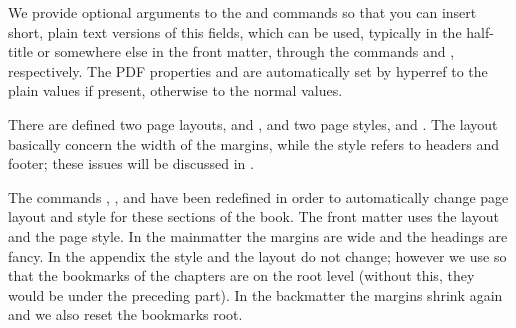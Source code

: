 We provide optional arguments to the  and 
 commands so that you can insert short, plain text 
versions of this fields, which can be used, typically in the half-title 
or somewhere else in the front matter, through the commands 
 and , respectively. The PDF 
properties  and  are automatically 
set by hyperref to the plain values if present, otherwise to the normal 
values.

There are defined two page layouts,  and , 
and two page styles,  and . The layout 
basically concern the width of the margins, while the style refers to 
headers and footer; these issues will be 
discussed in . 

The commands , , and 
 have been redefined in order to automatically 
change page layout and style for these sections of the book. The front 
matter uses the  layout and the  page 
style. In the mainmatter the margins are wide and the headings are 
fancy. In the appendix the style and the layout do not change; however 
we use  so that the bookmarks of 
the chapters are on the root level (without this, they would be under 
the preceding part). In the backmatter the margins shrink again and we 
also reset the bookmarks root.
